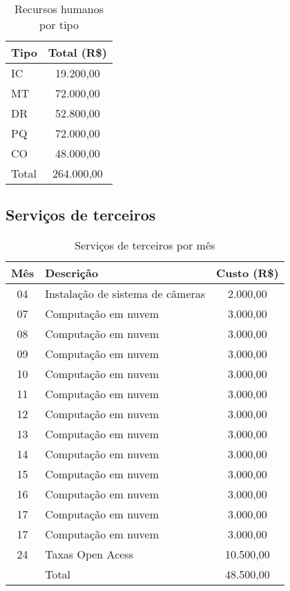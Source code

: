 \begin{table}[!h]
\centering
	\caption{Recursos humanos por tipo}
\begin{tabular}{ lc}
\toprule
   Tipo  & Total (R\$) \\
\midrule
   IC    &   19.200,00 \\
   MT    &   72.000,00 \\
   DR    &   52.800,00 \\
   PQ    &   72.000,00 \\
   CO    &   48.000,00 \\
\midrule
   Total     &   264.000,00 \\
\bottomrule
\end{tabular}
	\label{tab:rhtipo}
\end{table}
 
\subsection{Serviços de terceiros}
\begin{table}[!h]
\centering
	\caption{Serviços de terceiros por mês}
\begin{tabular}{clc}
\toprule
	Mês   & Descrição & Custo (R\$) \\
	\midrule
	04    & Instalação de sistema de câmeras   & 2.000,00 \\
	07    & Computação em nuvem                & 3.000,00 \\
	08    & Computação em nuvem                & 3.000,00 \\
	09    & Computação em nuvem                & 3.000,00 \\
	10    & Computação em nuvem                & 3.000,00 \\
	11    & Computação em nuvem                & 3.000,00 \\
	12    & Computação em nuvem                & 3.000,00 \\
	13    & Computação em nuvem                & 3.000,00 \\
	14    & Computação em nuvem                & 3.000,00 \\
	15    & Computação em nuvem                & 3.000,00 \\
	16    & Computação em nuvem                & 3.000,00 \\
	17    & Computação em nuvem                & 3.000,00 \\
	17    & Computação em nuvem                & 3.000,00 \\
	24    & Taxas Open Acess                   &10.500,00 \\
\midrule
	      & Total                              &48.500,00 \\
\bottomrule
\end{tabular}
	\label{tab:ter}
\end{table}
 
